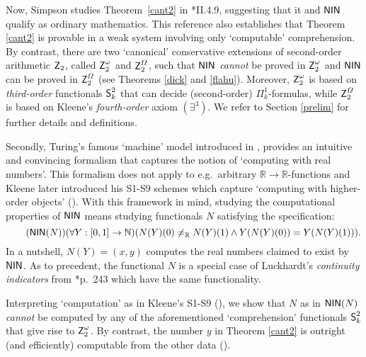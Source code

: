 \documentclass[reqno]{amsart}
\newcommand\be{\begin{equation}}
\newcommand\ee{\end{equation}}
\def\Z{\textup{\textsf{Z}}}
\def\N{{\mathbb  N}}
\def\R{{\mathbb  R}}
\def\di{\rightarrow}
\def\NIN{\textup{\textsf{NIN}}}
\def\SS{\textup{\textsf{S}}}
\numberwithin{equation}{section}
\numberwithin{thm}{section}
\begin{document}
\smallskip

Now, Simpson studies Theorem~\ref{cant2} in \cite{simpson2}*{II.4.9}, suggesting that it and $\NIN$ qualify as ordinary mathematics.
This reference also establishes that Theorem \ref{cant2} is provable in a weak system involving only `computable' comprehension.  
By contrast, there are two `canonical' conservative extensions of second-order arithmetic $\Z_{2}$, called $\Z_{2}^{\omega}$ and $\Z_{2}^{\Omega}$, such that 
$\NIN$ \emph{cannot} be proved in $\Z_{2}^{\omega}$ and $\NIN$ can be proved in $\Z_{2}^{\Omega}$ (see Theorems \ref{dick} and \ref{flahu}).
Moreover, $\Z_{2}^{\omega}$ is based on \emph{third-order} functionals $\SS_{k}^{2}$ that can decide (second-order) $\Pi_{k}^{1}$-formulas, while $\Z_{2}^{\Omega}$ is based on Kleene's \emph{fourth-order} axiom $(\exists^{3})$.
We refer to Section \ref{prelim} for further details and definitions.  

\smallskip

Secondly, Turing's famous `machine' model introduced in \cite{tur37}, provides an intuitive and convincing formalism that captures the notion of `computing with real numbers'.  
This formalism does not apply to e.g.\ arbitrary $\R\di \R$-functions and Kleene later introduced his S1-S9 schemes which capture `computing with higher-order objects' (\cites{kleeneS1S9, longmann}).  
With this framework in mind, studying the computational properties of $\NIN$ means studying functionals $N$ satisfying the specification:
\be\tag{$\NIN(N)$}
(\forall Y:[0,1]\di \N)(  N(Y)(0)\ne_{\R} N(Y)(1)\wedge  Y(N(Y)(0))=Y(N(Y)(1)) ).
\ee
In a nutshell, $N(Y)=(x, y)$ computes the real numbers claimed to exist by $\NIN$.
As to precedent, the functional $N$ is a special case of Luckhardt's \emph{continuity indicators} from \cite{lucky}*{p.\ 243} which have the same functionality. 

\smallskip

Interpreting `computation' as in Kleene's S1-S9 (\cite{kleeneS1S9, longmann}), we show that $N$ as in $\NIN(N)$ \emph{cannot} be computed by any of the aforementioned `comprehension' functionals $\SS_{k}^{2}$ that give rise to $\Z_{2}^{\omega}$.
By contrast, the number $y$ in Theorem \ref{cant2} is outright (and efficiently) computable from the other data (\cite{grayk,simpson2}). 

\smallskip
\end{document}
